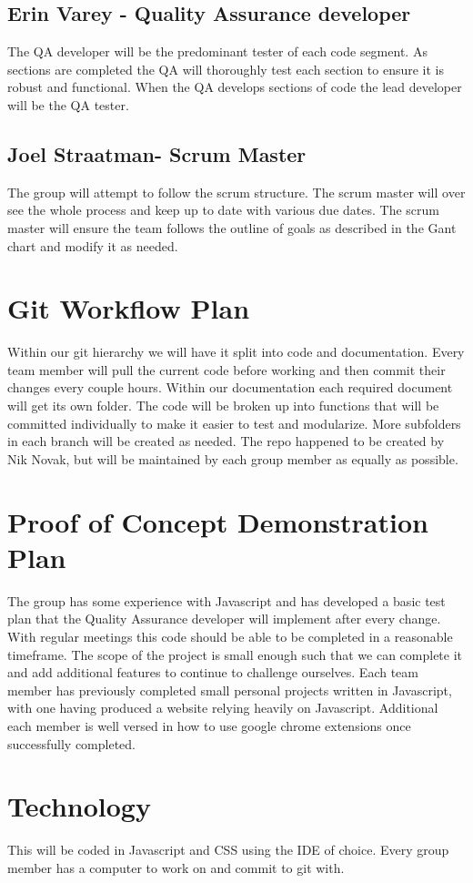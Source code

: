 \documentclass{article}
\begin{document}
\subsection{Erin Varey - Quality Assurance developer}
The QA developer will be the predominant tester of each code segment. As sections are completed the QA will thoroughly test each section to ensure it is robust and functional. When the QA develops sections of code the lead developer will be the QA tester. 
\subsection{Joel Straatman- Scrum Master}
The group will attempt to follow the scrum structure. The scrum master will over see the whole process and keep up to date with various due dates. The scrum master will ensure the team follows the outline of goals as described in the Gant chart and modify it as needed. 
\section{Git Workflow Plan}
Within our git hierarchy we will have it split into code and documentation. Every team member will pull the current code before working and then commit their changes every couple hours. Within our documentation each required document will get its own folder. The code will be broken up into functions that will be committed individually to make it easier to test and modularize. More subfolders in each branch will be created as needed. The repo happened to be created by Nik Novak, but will be maintained by each group member as equally as possible.
\section{Proof of Concept Demonstration Plan}
The group has some experience with Javascript and has developed a basic test plan that the Quality Assurance developer will implement after every change. With regular meetings this code should be able to be completed in a reasonable timeframe. The scope of the project is small enough such that we can complete it and add additional features to continue to challenge ourselves. Each team member has previously completed small personal projects written in Javascript, with one having produced a website relying heavily on Javascript. Additional each member is well versed in how to use %
google chrome extensions once successfully completed. 
\section{Technology}
This will be coded in Javascript and CSS using the IDE of choice. Every group member has a computer to work on and commit to git with.
\end{document}
